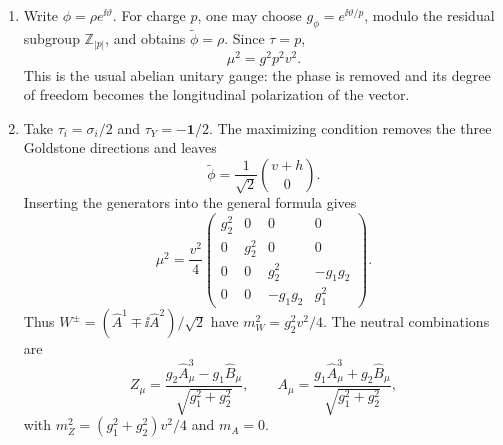 \begin{enumerate}
\begin{enumerate}
    \item Write \(\phi=\rho e^{\ii\vartheta}\).  For charge \(p\), one may
      choose \(g_\phi=e^{\ii\vartheta/p}\), modulo the residual subgroup
      \(\mathbb Z_{|p|}\), and obtains \(\widetilde\phi=\rho\).  Since
      \(\tau=p\),
      \[
        \mu^2=g^2p^2v^2.
      \]
      This is the usual abelian unitary gauge: the phase is removed and its
      degree of freedom becomes the longitudinal polarization of the vector.

    \item Take \(\tau_i=\sigma_i/2\) and
      \(\tau_Y=-\mathbf1/2\).  The maximizing condition removes the three
      Goldstone directions and leaves
      \[
        \widetilde\phi=\frac1{\sqrt2}\binom{v+h}{0}.
      \]
      Inserting the generators into the general formula gives
      \[
        \mu^2=\frac{v^2}{4}
        \begin{pmatrix}
          g_2^2&0&0&0\\
          0&g_2^2&0&0\\
          0&0&g_2^2&-g_1g_2\\
          0&0&-g_1g_2&g_1^2
        \end{pmatrix}.
      \]
      Thus \(W^\pm=(\widehat A^1\mp \ii\widehat A^2)/\sqrt2\) have
      \(m_W^2=g_2^2v^2/4\).  The neutral combinations are
      \[
        Z_\mu=\frac{g_2\widehat A^3_\mu-g_1\widehat B_\mu}
                    {\sqrt{g_1^2+g_2^2}},
        \qquad
        A_\mu=\frac{g_1\widehat A^3_\mu+g_2\widehat B_\mu}
                    {\sqrt{g_1^2+g_2^2}},
      \]
      with \(m_Z^2=(g_1^2+g_2^2)v^2/4\) and \(m_A=0\).
  \end{enumerate}

\end{enumerate}
